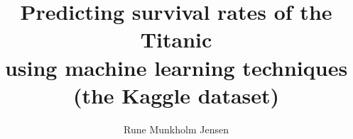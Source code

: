 \documentclass[11.5pt]{article}
\newenvironment{colfigure} {
		\par\medskip\noindent\minipage{\linewidth}
	} {
		\endminipage\par\medskip
	}
\def\datapath{../data}
\begin{document}
	

\title{
	Predicting survival rates of the Titanic \\using machine learning techniques\\ (the Kaggle dataset) }
\author{
	Rune Munkholm Jensen\\
}
\date{}

\maketitle



			
\newpage
%			

\twocolumn
			

\newcommand{\dataFigure}[3][width=0.75\linewidth]{
	\begin{colfigure}
		\centering
		\texttt{[image: \\datapath/image/\#2]}
\captionof{figure}{\small #3}
		\label{fig:#2}
	\end{colfigure}
}			
\newcommand{\fullWidthDataFigure}[3][width=0.75\linewidth]{
	\begin{figure*}
		\centering
		\texttt{[image: \\datapath/image/\#2]}
		\captionof{figure}{\small #3}
		\label{fig:#2}
	\end{figure*}
}			





%
\end{document}
